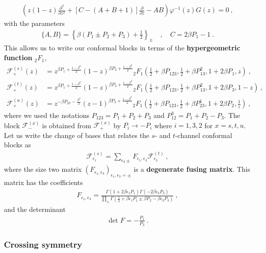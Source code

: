 \documentclass[12pt, a4paper]{article}
\theoremstyle{break}
\begin{document}
\begin{align}
 \left(z(1-z)\frac{\partial^2}{\partial z^2} + \left[C-(A+B+1)\right]\frac{\partial}{\partial z} -AB\right) \varphi^{-1}(z) G(z) = 0 \ , 
\end{align}
with the parameters 
\begin{align}
 \{A,B\} = \left\{\beta(P_1\pm P_2+P_3)+\tfrac12\right\}_\pm \quad , \quad  C=2\beta P_1-1\ .
\end{align}
This allows us to write our conformal blocks in terms of the \textbf{hypergeometric function} ${}_2F_1$,
\begin{align}
 \mathcal{F}_+^{(s)}(z) &= z^{\beta P_1 +\frac{1-\beta^2}{2}}(1-z)^{\beta P_3 + \frac{1-\beta^2}{2}} {}_2F_1\left(\tfrac12+ \beta P_{123},\tfrac12+\beta P_{13}^2,1+2\beta P_1,z\right) \ , 
 \\
 \mathcal{F}_+^{(t)}(z) &= z^{\beta P_1 +\frac{1-\beta^2}{2}}(1-z)^{\beta P_3 + \frac{1-\beta^2}{2}} {}_2F_1\left(\tfrac12+ \beta P_{123},\tfrac12+\beta P_{13}^2,1+2\beta P_3,1-z\right) \ , 
 \\
 \mathcal{F}_+^{(u)}(z) &= z^{-\beta P_{23} -\frac{\beta^2}{2}}(z-1)^{\beta P_3 + \frac{1-\beta^2}{2}} {}_2F_1\left(\tfrac12+ \beta P_{123},\tfrac12+\beta P_{23}^1,1+2\beta P_2,\tfrac{1}{z}\right) \ , 
\end{align}
where we used the notations $P_{123}=P_1+P_2+P_3$ and $P_{12}^3 = P_1+P_2-P_3$. The block $\mathcal{F}^{(x)}_-$ is obtained from $\mathcal{F}^{(x)}_+$ by $P_i\to -P_i$ where $i=1,3,2$ for $x=s,t,u$. 
Let us write 
the change of bases that relates the $s$- and $t$-channel conformal blocks as 
\begin{align}
 \mathcal{F}^{(s)}_{\epsilon_1} = \sum_{\epsilon_3\pm} F_{\epsilon_1,\epsilon_3} \mathcal{F}^{(t)}_{\epsilon_3}\ , 
 \label{fsfft}
\end{align}
where the size two matrix $\left(F_{\epsilon_1,\epsilon_3}\right)_{\epsilon_1,\epsilon_3=\pm}$ is a \textbf{degenerate fusing matrix}. This matrix has the coefficients 
\begin{align}
 \boxed{F_{\epsilon_1,\epsilon_3} = \frac{\Gamma(1+2\beta\epsilon_1P_1)\Gamma(-2\beta \epsilon_3P_3)}{\prod_\pm \Gamma(\frac12 +\beta \epsilon_1P_1 \pm \beta P_2 -\beta \epsilon_3P_3)}}\ ,
 \label{fee}
\end{align}
and the determinant 
\begin{align}
 \det F = -\frac{P_1}{P_3}\ .
 \label{detf}
\end{align}

\subsubsection{Crossing symmetry}
\end{document}
